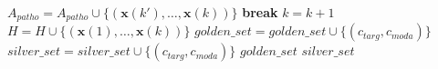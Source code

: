 \documentclass[notitlepage,oneside,onecolumn,a4paper]{article}
\begin{document}
\begin{algorithmic}[1]
                            \ENDIF
                        \ENDFOR
                    \ENDFOR
                        \STATE $A_{patho}=A_{patho}\cup \lbrace (\boldsymbol{x}(k'),\dots ,\boldsymbol{x}(k))\rbrace$
                        \STATE \textbf{break}
                    \ENDIF
                    \STATE $k=k+1$
                \ENDWHILE
                \STATE $H=H\cup \lbrace (\boldsymbol{x}(1),\dots ,\boldsymbol{x}(k))\rbrace$
            \ENDFOR
                    \STATE $golden\_set=golden\_set\cup \lbrace (c_{targ},c_{moda})\rbrace$
                \ELSE
                    \STATE $silver\_set=silver\_set\cup \lbrace (c_{targ},c_{moda})\rbrace$
                \ENDIF
            \ENDIF
        \ENDFOR
    \ENDFOR
\ENDFOR
\RETURN $golden\_set$
\RETURN $silver\_set$
\end{algorithmic}
\end{document}
